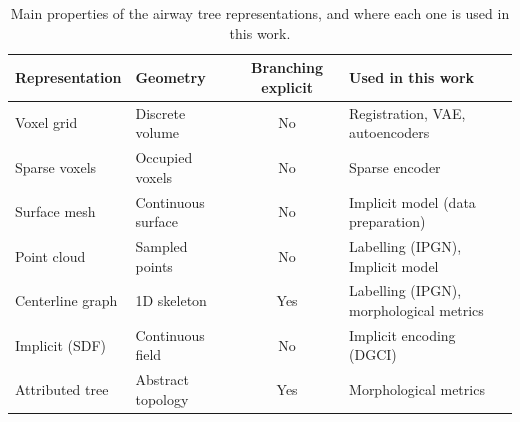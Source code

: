 \begin{table}[htbp]                      %
  \centering                             %
  \small                                 %
  \caption{Main properties of the airway tree representations, and where each one is used in
           this work.}
  \label{tab:airway_representations}     %
  \begin{tabular}{llcl}                  %
    \toprule
    Representation   & Geometry            & Branching explicit & Used in this work \\
    \midrule
    Voxel grid       & Discrete volume     & No  & Registration, VAE, autoencoders \\
    Sparse voxels    & Occupied voxels     & No  & Sparse encoder \\
    Surface mesh     & Continuous surface  & No  & Implicit model (data preparation) \\
    Point cloud      & Sampled points      & No  & Labelling (IPGN), Implicit model \\
    Centerline graph & 1D skeleton         & Yes & Labelling (IPGN), morphological metrics \\
    Implicit (SDF)   & Continuous field    & No  & Implicit encoding (DGCI) \\
    Attributed tree  & Abstract topology   & Yes & Morphological metrics \\
    \bottomrule
  \end{tabular}
\end{table}
